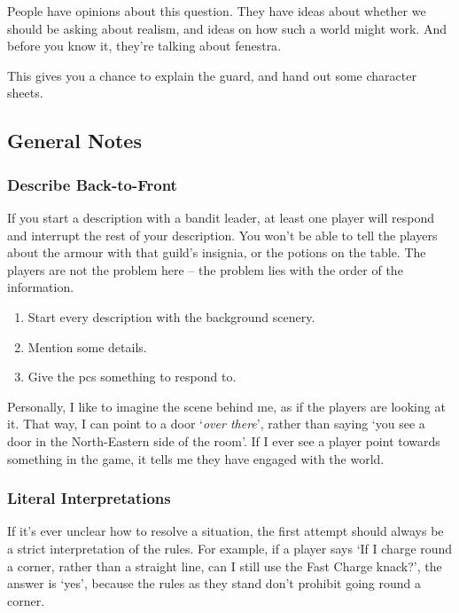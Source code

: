 \begin{multicols}{2}
People have opinions about this question.
They have ideas about whether we should be asking about realism, and ideas on how such a world might work.
And before you know it, they're talking about \gls{fenestra}.

This gives you a chance to explain the \gls{guard}, and hand out some character sheets.

\subsection{General Notes}

\subsubsection{Describe Back-to-Front}

If you start a description with a bandit leader, at least one player will respond and interrupt the rest of your description.
You won't be able to tell the players about the armour with that guild's insignia, or the potions on the table.
The players are not the problem here -- the problem lies with the order of the information.

\begin{enumerate}
  \item
  Start every description with the background scenery.
  \item
  Mention some details.
  \item
  Give the \glspl{pc} something to respond to.
\end{enumerate}

\noindent
Personally, I like to imagine the scene behind me, as if the players are looking at it.
That way, I can point to a door `\emph{over there}', rather than saying `you see a door in the North-Eastern side of the room'.
If I ever see a player point towards something in the game, it tells me they have engaged with the world.

\subsubsection{Literal Interpretations}

If it's ever unclear how to resolve a situation, the first attempt should always be a strict interpretation of the rules.
For example, if a player says `If I charge round a corner, rather than a straight line, can I still use the Fast Charge knack?', the answer is `yes', because the rules as they stand don't prohibit going round a corner.


\end{multicols}
